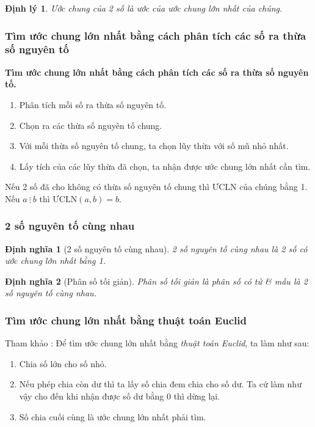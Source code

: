 \documentclass{article}
\numberwithin{equation}{section}
\newtheorem{dinhnghia}{Định nghĩa}[section]
\newtheorem{dinhly}{Định lý}[section]
\begin{document}
\begin{dinhly}
	Ước chung của 2 số là ước của ước chung lớn nhất của chúng.
\end{dinhly}

\subsubsection{Tìm ước chung lớn nhất bằng cách phân tích các số ra thừa số nguyên tố}
\begin{tcolorbox}
	\textbf{Tìm ước chung lớn nhất bằng cách phân  tích các số ra thừa số nguyên tố.}
	\begin{enumerate}
		\item Phân tích mỗi số ra thừa số nguyên tố.
		\item Chọn ra các thừa số nguyên tố chung.
		\item Với mỗi thừa số nguyên tố chung, ta chọn lũy thừa với số mũ nhỏ nhất.
		\item Lấy tích của các lũy thừa đã chọn, ta nhận được ước chung lớn nhất cần tìm.
	\end{enumerate}
\end{tcolorbox}
Nếu 2 số đã cho không có thừa số nguyên tố chung thì ƯCLN của chúng bằng 1. Nếu $a\ \vdots\ b$ thì $\mbox{ƯCLN}(a,b) = b$.

\subsubsection{2 số nguyên tố cùng nhau}

\begin{dinhnghia}[2 số nguyên tố cùng nhau]
	\emph{2 số nguyên tố cùng nhau} là 2 số có ước chung lớn nhất bằng 1.
\end{dinhnghia}

\begin{dinhnghia}[Phân số tối giản]
	\emph{Phân số tối giản} là phân số có tử \textit{\&} mẫu là 2 số nguyên tố cùng nhau.
\end{dinhnghia}

\subsubsection{Tìm ước chung lớn nhất bằng thuật toán Euclid}
Tham khảo \cite[p. 52]{SGK_Toan_6_Canh_Dieu_tap_1}: Để tìm ước chung lớn nhất bằng \textit{thuật toán Euclid}, ta làm như sau:
\begin{enumerate}
	\item Chia số lớn cho số nhỏ.
	\item Nếu phép chia còn dư thì ta lấy số chia đem chia cho số dư. Ta cứ làm như vậy cho đến khi nhận được số dư bằng 0 thì dừng lại.
	\item Số chia cuối cùng là ước chung lớn nhất phải tìm.
\end{enumerate}
\end{document}
